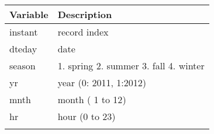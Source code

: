 \documentclass[11pt]{article}
\begin{document}
\begin{longtable}[]{@{}ll@{}}
\toprule
\begin{minipage}[b]{0.17\columnwidth}\raggedright\strut
Variable\strut
\end{minipage} & \begin{minipage}[b]{0.77\columnwidth}\raggedright\strut
Description\strut
\end{minipage}\tabularnewline
\midrule
\endhead
\begin{minipage}[t]{0.17\columnwidth}\raggedright\strut
instant\strut
\end{minipage} & \begin{minipage}[t]{0.77\columnwidth}\raggedright\strut
record index\strut
\end{minipage}\tabularnewline
\begin{minipage}[t]{0.17\columnwidth}\raggedright\strut
dteday\strut
\end{minipage} & \begin{minipage}[t]{0.77\columnwidth}\raggedright\strut
date\strut
\end{minipage}\tabularnewline
\begin{minipage}[t]{0.17\columnwidth}\raggedright\strut
season\strut
\end{minipage} & \begin{minipage}[t]{0.77\columnwidth}\raggedright\strut
1. spring 2. summer 3. fall 4. winter\strut
\end{minipage}\tabularnewline
\begin{minipage}[t]{0.17\columnwidth}\raggedright\strut
yr\strut
\end{minipage} & \begin{minipage}[t]{0.77\columnwidth}\raggedright\strut
year (0: 2011, 1:2012)\strut
\end{minipage}\tabularnewline
\begin{minipage}[t]{0.17\columnwidth}\raggedright\strut
mnth\strut
\end{minipage} & \begin{minipage}[t]{0.77\columnwidth}\raggedright\strut
month ( 1 to 12)\strut
\end{minipage}\tabularnewline
\begin{minipage}[t]{0.17\columnwidth}\raggedright\strut
hr\strut
\end{minipage} & \begin{minipage}[t]{0.77\columnwidth}\raggedright\strut
hour (0 to 23)\strut
\end{minipage}\tabularnewline
\begin{minipage}[t]{0.17\columnwidth}\raggedright\strut

\end{minipage}
\end{longtable}
\end{document}
